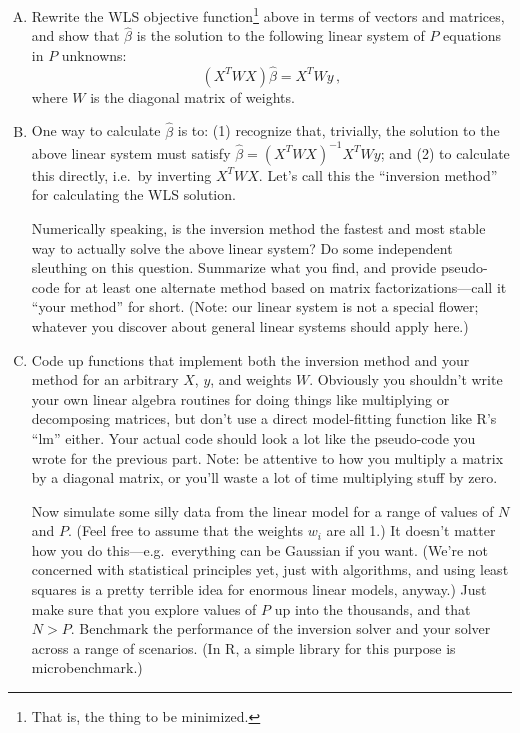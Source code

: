 \documentclass{mynotes}
\begin{document}
\begin{enumerate}[(A)]

\item Rewrite the WLS objective function\footnote{That is, the thing to be minimized.} above in terms of vectors and matrices, and show that $\hat \beta$ is the solution to the following linear system of $P$ equations in $P$ unknowns:
$$
(X^T W X) \hat \beta = X^T W y \, ,
$$
where $W$ is the diagonal matrix of weights.

\item One way to calculate $\hat{\beta}$ is to: (1) recognize that, trivially, the solution to the above linear system must satisfy $\hat \beta = (X^T W X)^{-1} X^T W y$; and (2) to calculate this directly, i.e.~by inverting $X^T W X$.  Let's call this the ``inversion method'' for calculating the WLS solution.

Numerically speaking, is the inversion method the fastest and most stable way to actually solve the above linear system?  Do some independent sleuthing on this question.  Summarize what you find, and provide pseudo-code for at least one alternate method based on matrix factorizations---call it ``your method'' for short.  (Note: our linear system is not a special flower; whatever you discover about general linear systems should apply here.)

\item Code up functions that implement both the inversion method and your method for an arbitrary $X$, $y$, and weights $W$.  Obviously you shouldn't write your own linear algebra routines for doing things like multiplying or decomposing matrices, but don't use a direct model-fitting function like R's ``lm'' either.   Your actual code should look a lot like the pseudo-code you wrote for the previous part.  Note: be attentive to how you multiply a matrix by a diagonal matrix, or you'll waste a lot of time multiplying stuff by zero.

Now simulate some silly data from the linear model for a range of values of $N$ and $P$.  (Feel free to assume that the weights $w_i$ are all 1.)  It doesn't matter how you do this---e.g.~everything can be Gaussian if you want.  (We're not concerned with statistical principles yet, just with algorithms, and using least squares is a pretty terrible idea for enormous linear models, anyway.)  Just make sure that you explore values of $P$ up into the thousands, and that $N > P$.  Benchmark the performance of the inversion solver and your solver across a range of scenarios.  (In R, a simple library for this purpose is microbenchmark.)


\end{enumerate}
\end{document}
